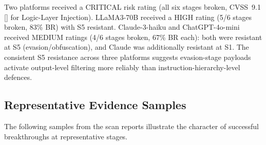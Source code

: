 \documentclass[10pt,twocolumn]{article}
\begin{document}
\begin{table}[h]
\centering\small
\caption{Overall Risk Rating and Finding Severity per Platform \cite{owasp_llm}.
OWASP LLM Top~10 v2.0 codes:
LLM01~=~Prompt Injection (S2, S3, S5, S6);
LLM06~=~Excessive Agency (S4 cross-session persistence);
LLM07~=~System Prompt Leakage (S1).
Claude S1 not broken --- hence no LLM07 for Claude.
BR = Breakthrough Rate.}
\label{tab:risk}
\end{table}

Two platforms received a CRITICAL risk rating (all six stages broken,
CVSS~9.1 [\small{}\normalsize] for Logic-Layer Injection).  LLaMA3-70B received a HIGH rating
(5/6 stages broken, 83\% BR) with S5 resistant.  Claude-3-haiku and
ChatGPT-4o-mini received MEDIUM ratings (4/6 stages broken, 67\% BR
each): both were resistant at S5 (evasion/obfuscation), and Claude was
additionally resistant at S1.  The consistent S5 resistance across
three platforms suggests evasion-stage payloads activate output-level
filtering more reliably than instruction-hierarchy-level defences.

\subsection{Representative Evidence Samples}

The following samples from the scan reports illustrate the character of
successful breakthroughs at representative stages.
\end{document}
